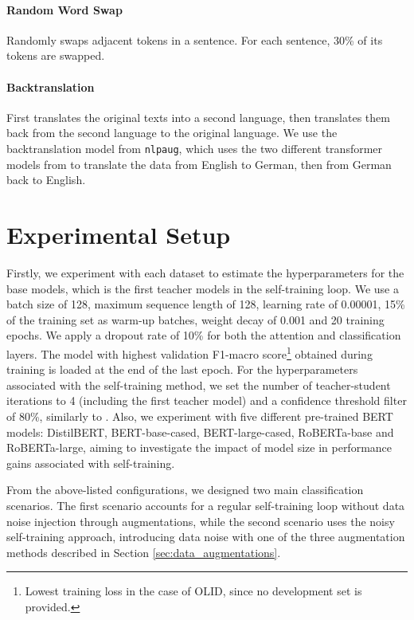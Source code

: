\documentclass[11pt,a4paper]{article}
\begin{document}
\paragraph*{Random Word Swap} Randomly swaps adjacent tokens in a sentence. For each sentence, 30\% of its tokens are swapped.
\paragraph*{Backtranslation} First translates the original texts into a second language, then translates them back from the second language to the original language. We use the backtranslation model from \texttt{nlpaug}, which uses
the two different transformer models from \citet{ng-etal-2019-facebook} to translate the data from English to German, then from German back to English.

\section{Experimental Setup}
Firstly, we experiment with each dataset to estimate the hyperparameters for the base models, which is the first teacher models in the self-training loop. We use a batch size of 128, maximum sequence length of 128, learning rate of 0.00001, 15\% of the training set as warm-up batches, weight decay of 0.001 and 20 training epochs. We apply a dropout rate of 10\% for both the attention and classification layers. The model with highest validation F1-macro score\footnote{Lowest training loss in the case of OLID, since no development set is provided.} obtained during training is loaded at the end of the last epoch. For the hyperparameters associated with the self-training method, we set the number of teacher-student iterations to 4 (including the first teacher model) and a confidence threshold filter of 80\%, similarly to \citet{xie2020unsupervised}. Also, we experiment with five different pre-trained BERT models: DistilBERT, BERT-base-cased, BERT-large-cased, RoBERTa-base and RoBERTa-large, aiming to investigate the impact of model size in performance gains associated with self-training.

From the above-listed configurations, we designed two main classification scenarios. The first scenario accounts for a regular self-training loop without data noise injection through augmentations, while the second scenario uses the noisy self-training approach, introducing data noise with one of the three augmentation methods described in Section \ref{sec:data_augmentations}.
\end{document}
